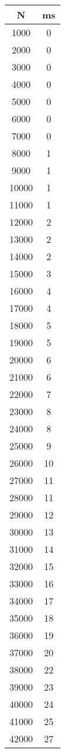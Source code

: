 \documentclass[ngerman,a4paper]{report}
\begin{document}
\begin{tabular}{|c|c|}
\hline
N & ms\\
\hline
1000 & 0\\
\hline
2000 & 0\\
\hline
3000 & 0\\
\hline
4000 & 0\\
\hline
5000 & 0\\
\hline
6000 & 0\\
\hline
7000 & 0\\
\hline
8000 & 1\\
\hline
9000 & 1\\
\hline
10000 & 1\\
\hline
11000 & 1\\
\hline
12000 & 2\\
\hline
13000 & 2\\
\hline
14000 & 2\\
\hline
15000 & 3\\
\hline
16000 & 4\\
\hline
17000 & 4\\
\hline
18000 & 5\\
\hline
19000 & 5\\
\hline
20000 & 6\\
\hline
21000 & 6\\
\hline
22000 & 7\\
\hline
23000 & 8\\
\hline
24000 & 8\\
\hline
25000 & 9\\
\hline
26000 & 10\\
\hline
27000 & 11\\
\hline
28000 & 11\\
\hline
29000 & 12\\
\hline
30000 & 13\\
\hline
31000 & 14\\
\hline
32000 & 15\\
\hline
33000 & 16\\
\hline
34000 & 17\\
\hline
35000 & 18\\
\hline
36000 & 19\\
\hline
37000 & 20\\
\hline
38000 & 22\\
\hline
39000 & 23\\
\hline
40000 & 24\\
\hline
41000 & 25\\
\hline
42000 & 27\\

\end{tabular}
\end{document}
